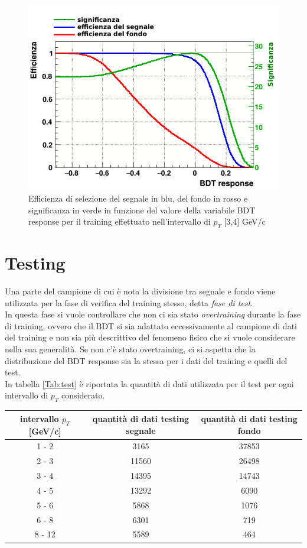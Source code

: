     \begin{figure}[h] 
        \centering
        \includegraphics[width=0.7\linewidth]{training&testing/significanza.png}
        \caption{Efficienza di selezione del segnale in blu, del fondo in rosso e significanza in verde in funzione del valore della variabile BDT response per il training effettuato nell'intervallo di $p_T$ [3,4] GeV/c }
        \label{fig:efficienza}
    \end{figure}

\clearpage
\section{Testing} \label{testing}
    Una parte del campione di cui è nota la divisione tra segnale e fondo viene utilizzata per la fase di verifica del training stesso, detta \textit{fase di test}. 
    \\In questa fase si vuole controllare che non ci sia stato \textit{overtraining} durante la fase di training, ovvero che il BDT si sia adattato eccessivamente al campione di dati del training e non sia più descrittivo del fenomeno fisico che si vuole considerare nella  sua generalità. Se non c'è stato overtraining, ci si aspetta che la distribuzione del BDT response sia la stessa per i dati del training e quelli del test. 
    \\In tabella \ref{Tab:test} è riportata la quantità di dati utilizzata per il test per ogni intervallo di $p_T$ considerato.
    
    \begin{table}[H]
		\centering
		\begin{tabular}{c|c|c}
		    \toprule
		    intervallo $p_T$ [GeV/c]  &  quantità di dati testing segnale & quantità di dati testing fondo  \\
            \midrule
            1 - 2  	&  3165   &  37853  \\ 
            2 - 3 	&  11560   &  26498  \\
            3 - 4  	&  14395   &  14743  \\ 
            4 - 5  	&  13292   &  6090 \\ 
            5 - 6  	&  5868   &  1076  \\ 
            6 - 8  	&  6301   &  719  \\ 
            8 - 12  &  5589   &   464 \\   
			\bottomrule
		\end{tabular}
	\end{table}
    
